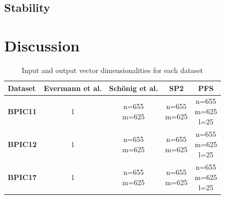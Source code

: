 \subsection*{Stability}

\section{Discussion}\label{sec:eval:discussion}

\begin{table}[ht!]
\centering
\begin{tabular}{lcccc}
\textbf{Dataset} & \textbf{Evermann et al.} & \textbf{Schönig et al.} & \textbf{SP2} & \textbf{PFS}\\
\hline
\hline
\textbf{BPIC11} & 1 & \makecell{n=655\\m=625} & \makecell{n=655\\m=625} & \makecell{n=655\\m=625\\ l=25} \\
\hline
\textbf{BPIC12} & 1 & \makecell{n=655\\m=625} & \makecell{n=655\\m=625} & \makecell{n=655\\m=625\\ l=25} \\
\hline
\textbf{BPIC17} & 1 & \makecell{n=655\\m=625} & \makecell{n=655\\m=625} & \makecell{n=655\\m=625\\ l=25} \\
\end{tabular}
\caption{Input and output vector dimensionalities for each dataset}
\label{tab:network-info}
\end{table}